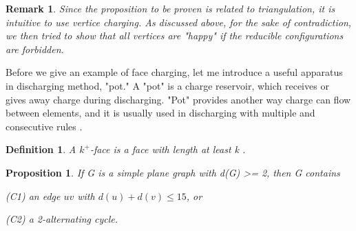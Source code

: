 \documentclass[a4paper, 11pt]{article} %
\newtheorem*{definition}{Definition}
\newtheorem*{remark}{Remark}
\newtheorem{proposition}{Proposition}[section]
\begin{document}
\begin{remark}
Since the proposition to be proven is related to triangulation, it is intuitive to use vertice charging. As discussed above, for the sake of contradiction, we then tried to show that all vertices are "happy" if the reducible configurations are forbidden.
\end{remark} 

Before we give an example of face charging, let me introduce a useful apparatus in discharging method, "pot." A "pot" is a charge reservoir, which receives or gives away charge during discharging. "Pot" provides another way charge can flow between elements, and it is usually used in discharging with multiple and consecutive rules \cite{cranston2013guide}. 

\begin{definition}
A $k^{+}$-face is a face with length at least k \cite{cranston2013guide}.
\end{definition}

\begin{proposition}
\cite{borodin1990generalization} If G is a simple plane graph with d(G) >= 2, then G contains

(C1) an edge $uv$ with $d(u) + d(v) \leq 15$, or

(C2) a 2-alternating cycle.
\end{proposition} 
\end{document}
